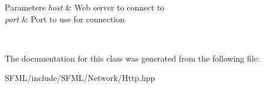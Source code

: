 \begin{DoxyParams}{Parameters}
{\em host} & Web server to connect to \\
\hline
{\em port} & Port to use for connection \begin{DoxyVerb}\end{DoxyVerb}
 \\
\hline
\end{DoxyParams}


The documentation for this class was generated from the following file\+:\begin{DoxyCompactItemize}
\item 
S\+F\+M\+L/include/\+S\+F\+M\+L/\+Network/Http.\+hpp\end{DoxyCompactItemize}
